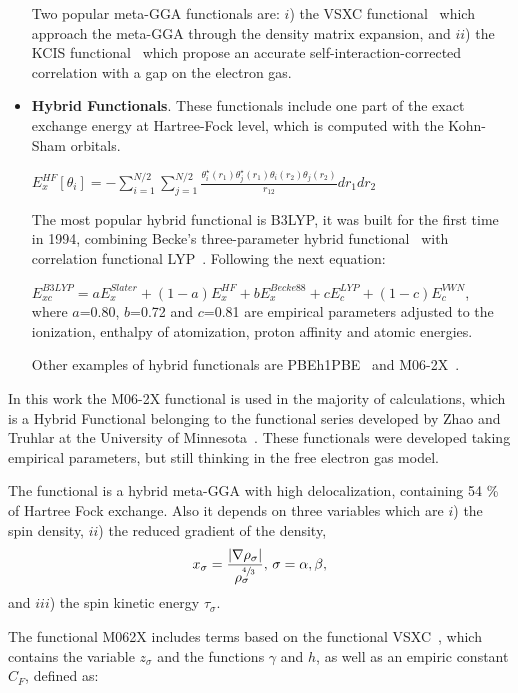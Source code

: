 \begin{itemize}
Two popular meta-GGA functionals are: $i$) the VSXC
functional~\cite{VanVoorhis1998} which approach the meta-GGA through the
density matrix expansion, and $ii$) the KCIS functional~\cite{1999} which
propose an accurate self-interaction-corrected correlation with a gap on the
electron gas.


\item \textbf{Hybrid Functionals}.
These functionals include one part of the exact exchange
energy at Hartree-Fock level,
which is computed with the Kohn-Sham orbitals.

$E_{x}^{HF} [\theta_{i}] = -\displaystyle\sum_{i=1}^{N/2}\displaystyle\sum_{j=1}^{N/2}
\displaystyle\frac{\theta_{i}^{\star}(r_{1}) \theta_{j}^{\star}(r_{1}) \theta_{i}(r_{2}) \theta_{j}(r_{2})}
{r_{12}} dr_{1}dr_{2}$

The most popular hybrid functional is B3LYP, it was built for the first time
in 1994, combining Becke's three-parameter hybrid functional~\cite{Becke1993} with
correlation functional LYP~\cite{Lee1988}. Following the next equation:

$E_{xc}^{B3LYP} = aE_{x}^{Slater} + (1-a)E_{x}^{HF} +bE_{x}^{Becke88}
+cE_{c}^{LYP} +(1-c)E_{c}^{VWN}$,\\

where $a$=0.80, $b$=0.72 and $c$=0.81 are empirical parameters adjusted to
the ionization, enthalpy of atomization, proton affinity and atomic energies.

Other examples of hybrid functionals are PBEh1PBE~\cite{Ernzerhof1998} and
M06-2X~\cite{Zhao2007}.
\end{itemize}

In this work the M06-2X functional is used in the majority of calculations,
which is a Hybrid Functional belonging to the functional series developed by
Zhao and Truhlar at the University of Minnesota~\cite{Zhao2007}. These
functionals were developed taking empirical parameters, but still thinking
in the free electron gas model.

The functional is a hybrid meta-GGA with high delocalization, containing 54 \%
of Hartree Fock exchange. Also it depends on three variables which are $i$) the
spin density, $ii$) the reduced gradient of the density,
\begin{align}
x_{\sigma} = \frac{|\nabla \rho_\sigma|}{\rho^{\sfrac43}_{\sigma}}, \, \sigma=\alpha,\beta,
\end{align}
and $iii$) the spin kinetic energy $\tau_\sigma$.

The functional M062X includes terms based on the functional VSXC~\cite{VanVoorhis1998}, which
contains the variable  $z_\sigma$ and the functions $\gamma$ and $h$,
as well as an empiric constant $C_F$, defined as:


